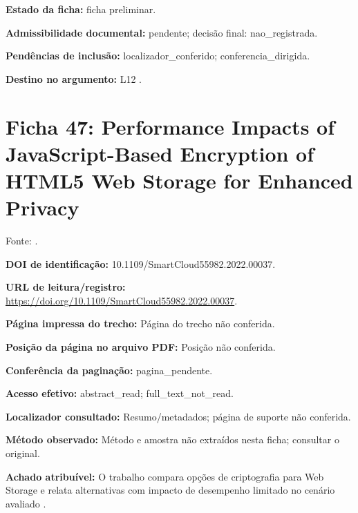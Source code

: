 \noindent\textbf{Estado da ficha:} ficha preliminar.\par\medskip

\noindent\textbf{Admissibilidade documental:} pendente; decisão final: nao\_registrada.\par\medskip

\noindent\textbf{Pendências de inclusão:} localizador\_conferido; conferencia\_dirigida.\par\medskip

\noindent\textbf{Destino no argumento:} L12 .

\clearpage\section*{Ficha 47: Performance Impacts of JavaScript-Based Encryption of HTML5 Web Storage for Enhanced Privacy}

Fonte: \citet{OS09}.

\noindent\textbf{DOI de identificação:} 10.1109/SmartCloud55982.2022.00037.\par\medskip

\noindent\textbf{URL de leitura/registro:} \url{https://doi.org/10.1109/SmartCloud55982.2022.00037}.\par\medskip

\noindent\textbf{Página impressa do trecho:} Página do trecho não conferida.\par\medskip

\noindent\textbf{Posição da página no arquivo PDF:} Posição não conferida.\par\medskip

\noindent\textbf{Conferência da paginação:} pagina\_pendente.\par\medskip

\noindent\textbf{Acesso efetivo:} abstract\_read; full\_text\_not\_read.\par\medskip

\noindent\textbf{Localizador consultado:} Resumo/metadados; página de suporte não conferida.\par\medskip

\noindent\textbf{Método observado:} Método e amostra não extraídos nesta ficha; consultar o original.\par\medskip

\noindent\textbf{Achado atribuível:} O trabalho compara opções de criptografia para Web Storage e relata alternativas com impacto de desempenho limitado no cenário avaliado \citep{OS09}.\par\medskip


